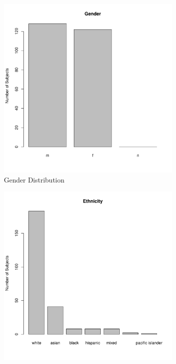 \documentclass[]{article}
\begin{document}
\begin{figure}[!ht]
    \begin{subfigure}[h]{0.5\textwidth}
    \centering
            \includegraphics[clip,scale=0.4]{figures/gender-plot.pdf}
        \caption{ Gender Distribution}
        \label{fig:gender-plot}
    \end{subfigure}
    \begin{subfigure}[h]{0.5\textwidth}
    \centering
        \includegraphics[clip,scale=0.4]{figures/ethnicity-plot.pdf}

\end{subfigure}
\end{figure}
\end{document}
